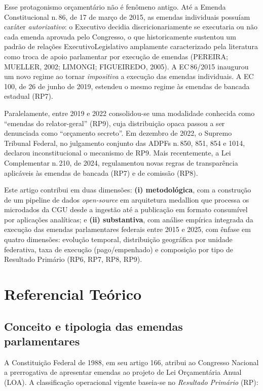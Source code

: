 \documentclass[12pt,a4paper,oneside]{article}
\begin{document}
Esse protagonismo orçamentário não é fenômeno antigo. Até a Emenda
Constitucional n.\,86, de 17 de março de 2015, as emendas individuais
possuíam caráter \textit{autorizativo}: o Executivo decidia
discricionariamente se executaria ou não cada emenda aprovada pelo
Congresso, o que historicamente sustentou um padrão de relações
Executivo\textendash Legislativo amplamente caracterizado pela
literatura como troca de apoio parlamentar por execução de emendas
(PEREIRA; MUELLER, 2002; LIMONGI; FIGUEIREDO, 2005). A EC\,86/2015
inaugurou um novo regime ao tornar \textit{impositiva} a execução
das emendas individuais. A EC\,100, de 26 de junho de 2019, estendeu
o mesmo regime às emendas de bancada estadual (RP7).

Paralelamente, entre 2019 e 2022 consolidou-se uma modalidade
conhecida como ``emendas do relator-geral'' (RP9), cuja distribuição
opaca passou a ser denunciada como ``orçamento secreto''. Em dezembro
de 2022, o Supremo Tribunal Federal, no julgamento conjunto das
ADPFs n.\,850, 851, 854 e 1014, declarou inconstitucional o mecanismo
de RP9. Mais recentemente, a Lei Complementar n.\,210, de 2024,
regulamentou novas regras de transparência aplicáveis às emendas de
bancada (RP7) e de comissão (RP8).

Este artigo contribui em duas dimensões: \textbf{(i) metodológica},
com a construção de um pipeline de dados \textit{open-source} em
arquitetura medallion que processa os microdados da CGU desde a
ingestão até a publicação em formato consumível por aplicações
analíticas; e \textbf{(ii) substantiva}, com análise empírica
integrada da execução das emendas parlamentares federais entre 2015
e 2025, com ênfase em quatro dimensões: evolução temporal,
distribuição geográfica por unidade federativa, taxa de execução
(pago/empenhado) e composição por tipo de Resultado Primário (RP6,
RP7, RP8, RP9).

\section{Referencial Teórico}\label{sec:teoria}

\subsection{Conceito e tipologia das emendas parlamentares}

A Constituição Federal de 1988, em seu artigo 166, atribui ao
Congresso Nacional a prerrogativa de apresentar emendas ao projeto
de Lei Orçamentária Anual (LOA). A classificação operacional vigente
baseia-se no \textit{Resultado Primário} (RP):
\end{document}
